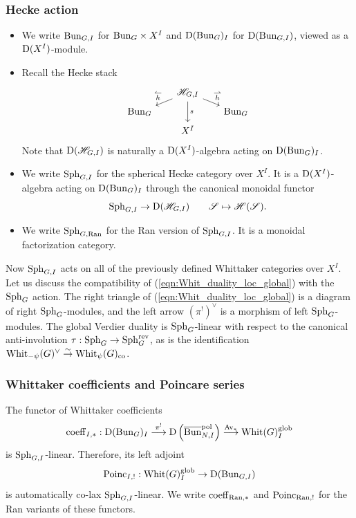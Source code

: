 \subsubsection{Hecke action} 
\begin{itemize}
    \item We write $\mathrm{Bun}_{G,I}$ for $\mathrm{Bun}_G \times X^I$ and $\mathrm{D}(\mathrm{Bun}_G)_I$ for $\mathrm{D}(\mathrm{Bun}_{G,I})$, viewed as a $\mathrm{D}(X^I)$-module.
    \item Recall the Hecke stack
        \[
        \begin{tikzcd}[
      column sep={5em,between origins},
      row sep={2em,between origins}
    ]
          & \HH_{G,I} \arrow[dl, "\hl" above left] \arrow[dr, "\hr"] \arrow[dd, "s"] &    \\
          \Bun_G & & \Bun_G \\
          & X^I &
        \end{tikzcd}
        \]
    Note that $\mathrm{D}(\mathscr{H}_{G,I})$ is naturally a $\mathrm{D}(X^I)$-algebra acting on $\mathrm{D}(\mathrm{Bun}_G)_I$.
    \item We write $\mathrm{Sph}_{G,I}$ for the spherical Hecke category over $X^I$. It is a $\mathrm{D}(X^I)$-algebra acting on $\mathrm{D}(\mathrm{Bun}_G)_I$ through the canonical monoidal functor
        \[
        \mathrm{Sph}_{G,I} \to \mathrm{D}(\mathscr{H}_{G,I})   
        \qquad \mathscr{S} \mapsto \mathscr{H}(\mathscr{S}).
        \]
    \item We write $\mathrm{Sph}_{G,\mathrm{Ran}}$ for the Ran version of $\mathrm{Sph}_{G,I}$. It is a monoidal factorization category.
\end{itemize}
Now $\mathrm{Sph}_{G,I}$ acts on all of the previously defined Whittaker categories over $X^I$. Let us discuss the compatibility of (\ref{eqn:Whit_duality_loc_global}) with the $\mathrm{Sph}_G$ action. The right triangle of (\ref{eqn:Whit_duality_loc_global}) is a diagram of right $\mathrm{Sph}_G$-modules, and the left arrow $(\pi^!)^\vee$ is a morphism of left $\mathrm{Sph}_G$-modules. The global Verdier duality is $\mathrm{Sph}_G$-linear with respect to the canonical anti-involution $\tau : \mathrm{Sph}_G \to \mathrm{Sph}_G^{\mathrm{rev}}$, as is the identification $\mathrm{Whit}_{-\psi}(G)^\vee \overset{\sim}{\rightarrow} \mathrm{Whit}_\psi(G)_{\mathrm{co}}$.

\subsubsection{Whittaker coefficients and Poincare series} The functor of Whittaker coefficients
    \[
    \mathrm{coeff}_{I,*} : \mathrm{D}(\mathrm{Bun}_G)_I \overset{\pi^!}{\longrightarrow} \mathrm{D}\left(\overline{\mathrm{Bun}}_{N,I}^{\mathrm{pol}} \right) \overset{\mathrm{Av}_*}{\longrightarrow} \mathrm{Whit}(G)_I^{\mathrm{glob}}
    \]
is $\mathrm{Sph}_{G,I}$-linear. Therefore, its left adjoint
    \[\mathrm{Poinc}_{I,!} : \mathrm{Whit}(G)_I^{\mathrm{glob}} \to \mathrm{D}(\mathrm{Bun}_{G,I})\]
is automatically co-lax $\mathrm{Sph}_{G,I}$-linear. We write $\mathrm{coeff}_{\mathrm{Ran},*}$ and $\mathrm{Poinc}_{\mathrm{Ran},!}$ for the Ran variants of these functors.

